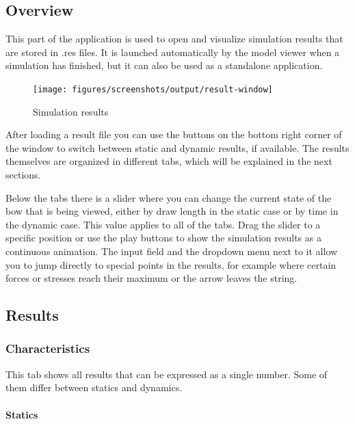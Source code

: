 \documentclass[12pt]{article}
\begin{document}
\subsection{Overview}

This part of the application is used to open and visualize simulation results that are stored in .res files.
It is launched automatically by the model viewer when a simulation has finished, but it can also be used as a standalone application.
\bigskip

\begin{figure}[H]
\centering
\texttt{[image: figures/screenshots/output/result-window]}
\caption{Simulation results}
\label{fig:result-window}
\end{figure}

After loading a result file you can use the buttons on the bottom right corner of the window to switch between static and dynamic results, if available.
The results themselves are organized in different tabs, which will be explained in the next sections.

Below the tabs there is a slider where you can change the current state of the bow that is being viewed, either by draw length in the static case or by time in the dynamic case.
This value applies to all of the tabs.
Drag the slider to a specific position or use the play buttons to show the simulation results as a continuous animation.
The input field and the dropdown menu next to it allow you to jump directly to special points in the results, for example where certain forces or stresses reach their maximum or the arrow leaves the string. 

\newpage
\subsection{Results}

\subsubsection{Characteristics}

This tab shows all results that can be expressed as a single number.
Some of them differ between statics and dynamics.

\paragraph*{Statics}
\end{document}
